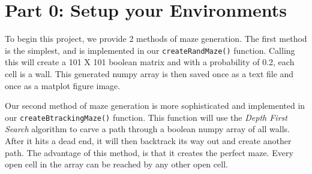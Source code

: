 
\section{Part 0: Setup your Environments}
\label{sec:Part 0} 
To begin this project, we provide 2 methods of maze generation. The first method is the simplest, and is implemented in our \texttt{createRandMaze()} function. Calling this will create a 101 X 101 boolean matrix and with a probability of 0.2, each cell is a wall. This generated numpy array is then saved once as a text file and once as a matplot figure image.

Our second method of maze generation is more sophisticated and implemented in our \texttt{createBtrackingMaze()} function. This function will use the \emph{Depth First Search} algorithm to carve a path through a boolean numpy array of all walls. After it hits a dead end, it will then backtrack its way out and create another path. The advantage of this method, is that it creates the perfect maze. Every open cell in the array can be reached by any other open cell.

